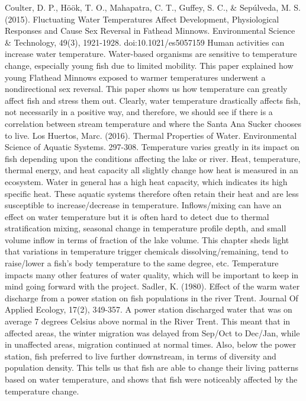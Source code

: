 \documentclass{tufte-handout}
\begin{document}
\begin{description}
Coulter, D. P., Höök, T. O., Mahapatra, C. T., Guffey, S. C., & Sepúlveda, M. S. (2015). Fluctuating Water Temperatures Affect Development, Physiological Responses and Cause Sex Reversal in Fathead Minnows. Environmental Science & Technology, 49(3), 1921-1928. doi:10.1021/es5057159
Human activities can increase water temperature. Water-based organisms are sensitive to temperature change, especially young fish due to limited mobility. This paper explained how young Flathead Minnows exposed to warmer temperatures underwent a nondirectional sex reversal. This paper shows us how temperature can greatly affect fish and stress them out. Clearly, water temperature drastically affects fish, not necessarily in a positive way, and therefore, we should see if there is a correlation between stream temperature and where the Santa Ana Sucker chooses to live.
Los Huertos, Marc. (2016). Thermal Properties of Water. Environmental Science of Aquatic Systems. 297-308.
Temperature varies greatly in its impact on fish depending upon the conditions affecting the lake or river. Heat, temperature, thermal energy, and heat capacity all slightly change how heat is measured in an ecosystem. Water in general has a high heat capacity, which indicates its high specific heat. These aquatic systems therefore often retain their heat and are less susceptible to increase/decrease in temperature. Inflows/mixing can have an effect on water temperature but it is often hard to detect due to thermal stratification mixing, seasonal change in temperature profile depth, and small volume inflow in terms of fraction of the lake volume. This chapter sheds light that variations in temperature trigger chemicals dissolving/remaining, tend to raise/lower a fish’s body temperature to the same degree, etc. Temperature impacts many other features of water quality, which will be important to keep in mind going forward with the project.
Sadler, K. (1980). Effect of the warm water discharge from a power station on fish populations in the river Trent. Journal Of Applied Ecology, 17(2), 349-357.
A power station discharged water that was on average 7 degrees Celsius above normal in the River Trent. This meant that in affected areas, the winter migration was delayed from Sep/Oct to Dec/Jan, while in unaffected areas, migration continued at normal times. Also, below the power station, fish preferred to live further downstream, in terms of diversity and population density. This tells us that fish are able to change their living patterns based on water temperature, and shows that fish were noticeably affected by the temperature change. 

\end{description}
\end{document}
